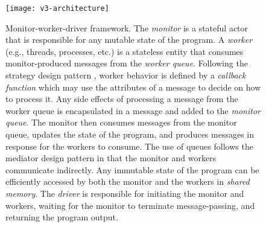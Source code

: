 \begin{figure}[htbp]
	\centering
	\texttt{[image: v3-architecture]}
	\caption[Monitor-worker-driver framework]{Monitor-worker-driver framework.
		The \emph{monitor} is a stateful actor that is responsible for any mutable state of the program. A \emph{worker} (e.g., threads, processes, etc.) is a stateless entity that consumes monitor-produced messages from the \emph{worker queue}. Following the strategy design pattern \cite{Gamma1994}, worker behavior is defined by a \emph{callback function} which may use the attributes of a message to decide on how to process it. Any side effects of processing a message from the worker queue is encapsulated in a message and added to the \emph{monitor queue}. The monitor then consumes messages from the monitor queue, updates the state of the program, and produces messages in response for the workers to consume. The use of queues follows the mediator design pattern \cite{Gamma1994} in that the monitor and workers communicate indirectly. Any immutable state of the program can be efficiently accessed by both the monitor and the workers in \emph{shared memory}. The \emph{driver} is responsible for initiating the monitor and workers, waiting for the monitor to terminate message-passing, and returning the program output.}
	\label{fig:v3-architecture}
\end{figure}

